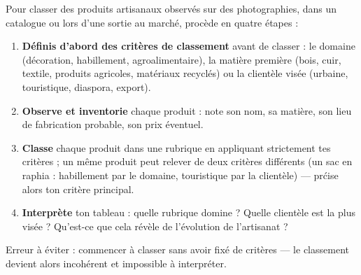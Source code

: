 \documentclass[11pt]{article}
\begin{document}
\begin{methode}
Pour classer des produits artisanaux observ\'es sur des photographies, dans un catalogue ou lors d'une sortie au march\'e, proc\`ede en quatre \'etapes :
\begin{enumerate}
\item \textbf{D\'efinis d'abord des crit\`eres de classement} avant de classer : le domaine (d\'ecoration, habillement, agroalimentaire), la mati\`ere premi\`ere (bois, cuir, textile, produits agricoles, mat\'eriaux recycl\'es) ou la client\`ele vis\'ee (urbaine, touristique, diaspora, export).
\item \textbf{Observe et inventorie} chaque produit : note son nom, sa mati\`ere, son lieu de fabrication probable, son prix \'eventuel.
\item \textbf{Classe} chaque produit dans une rubrique en appliquant strictement tes crit\`eres ; un m\^eme produit peut relever de deux crit\`eres diff\'erents (un sac en raphia : habillement par le domaine, touristique par la client\`ele) — pr\'cise alors ton crit\`ere principal.
\item \textbf{Interpr\`ete} ton tableau : quelle rubrique domine ? Quelle client\`ele est la plus vis\'ee ? Qu'est-ce que cela r\'ev\`ele de l'\'evolution de l'artisanat ?
\end{enumerate}
Erreur \`a \'eviter : commencer \`a classer sans avoir fix\'e de crit\`eres — le classement devient alors incoh\'erent et impossible \`a interpr\'eter.
\end{methode}
\end{document}
